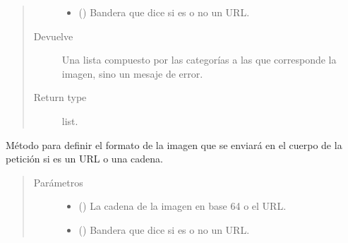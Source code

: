 \begin{fulllineitems}
\begin{fulllineitems}
\begin{fulllineitems}
\begin{quote}
\begin{description}
\begin{itemize}
\item {} 
 () \textendash{} Bandera que dice si es o no un URL.

\end{itemize}

\item[{Devuelve}] \leavevmode
Una lista compuesto por las categorías a las que corresponde la imagen, sino un mesaje de error.

\item[{Return type}] \leavevmode
list.

\end{description}\end{quote}

\end{fulllineitems}


\begin{fulllineitems}
\label{\detokenize{chapter_two/desc_cloudnao:app.tpa_client_libraries.google_cloud_vision.GoogleCloudVision.set_data}}
Método para definir el formato de la imagen que se enviará en el
cuerpo de la petición si es un URL o una cadena.
\begin{quote}\begin{description}
\item[{Parámetros}] \leavevmode\begin{itemize}
\item {} 
 () \textendash{} La cadena de la imagen en base 64 o el URL.

\item {} 
 () \textendash{} Bandera que dice si es o no un URL.

\end{itemize}

\end{description}\end{quote}

\end{fulllineitems}



\end{fulllineitems}
\end{fulllineitems}
